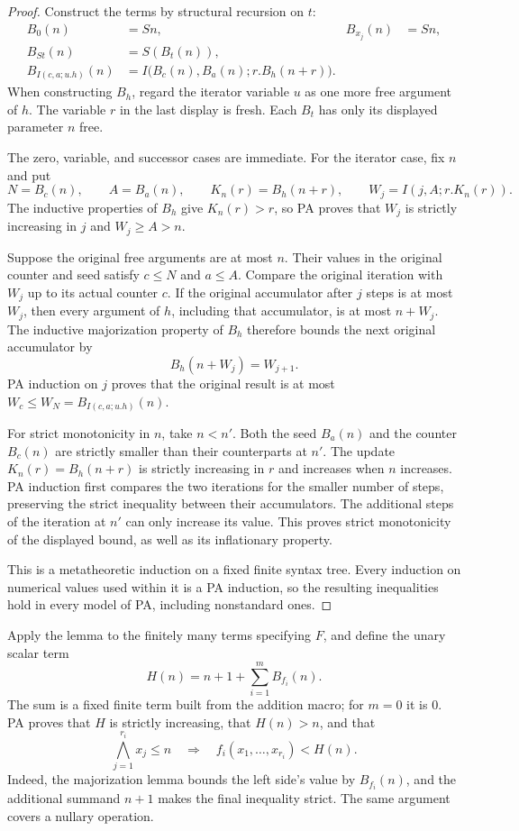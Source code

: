 \begin{proof}
Construct the terms by structural recursion on $t$:
\begin{align*}
 B_0(n)&=Sn,& B_{x_j}(n)&=Sn,\\
 B_{St}(n)&=S(B_t(n)),\\
 B_{I(c,a;u.h)}(n)
   &=I\bigl(B_c(n),B_a(n);r.B_h(n+r)\bigr).
\end{align*}
When constructing $B_h$, regard the iterator variable $u$ as one more free
argument of $h$.  The variable $r$ in the last display is fresh.  Each
$B_t$ has only its displayed parameter $n$ free.

The zero, variable, and successor cases are immediate.  For the iterator
case, fix $n$ and put
\[
 N=B_c(n),\qquad A=B_a(n),\qquad
 K_n(r)=B_h(n+r),\qquad W_j=I(j,A;r.K_n(r)).
\]
The inductive properties of $B_h$ give $K_n(r)>r$, so PA proves that
$W_j$ is strictly increasing in $j$ and $W_j\ge A>n$.

Suppose the original free arguments are at most $n$.  Their values in the
original counter and seed satisfy $c\le N$ and $a\le A$.  Compare the
original iteration with $W_j$ up to its actual counter $c$.  If the
original accumulator after $j$ steps is at most $W_j$, then every argument
of $h$, including that accumulator, is at most $n+W_j$.  The inductive
majorization property of $B_h$ therefore bounds the next original
accumulator by
\[
 B_h(n+W_j)=W_{j+1}.
\]
PA induction on $j$ proves that the original result is at most
$W_c\le W_N=B_{I(c,a;u.h)}(n)$.

For strict monotonicity in $n$, take $n<n'$.  Both the seed $B_a(n)$ and
the counter $B_c(n)$ are strictly smaller than their counterparts at $n'$.
The update $K_n(r)=B_h(n+r)$ is strictly increasing in $r$ and increases
when $n$ increases.  PA induction first compares the two iterations for
the smaller number of steps, preserving the strict inequality between
their accumulators.  The additional steps of the iteration at $n'$ can
only increase its value.  This proves strict monotonicity of the displayed
bound, as well as its inflationary property.

This is a metatheoretic induction on a fixed finite syntax tree.  Every
induction on numerical values used within it is a PA induction, so the
resulting inequalities hold in every model of PA, including nonstandard
ones.
\end{proof}

Apply the lemma to the finitely many terms specifying $F$, and define the
unary scalar term
\[
 H(n)=n+1+\sum_{i=1}^{m}B_{f_i}(n).
\]
The sum is a fixed finite term built from the addition macro; for $m=0$
it is $0$.  PA proves that $H$ is strictly increasing, that $H(n)>n$, and
that
\begin{equation}
 \bigwedge_{j=1}^{r_i}x_j\le n
 \quad\Longrightarrow\quad
 f_i(x_1,\ldots,x_{r_i})<H(n).
 \label{eq:finite-menu-majorant}
\end{equation}
Indeed, the majorization lemma bounds the left side's value by
$B_{f_i}(n)$, and the additional summand $n+1$ makes the final inequality
strict.  The same argument covers a nullary operation.

